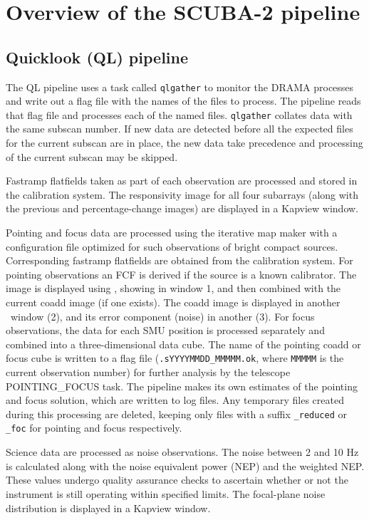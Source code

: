 \section{Overview of the SCUBA-2 pipeline\label{se:overview}}

\subsection{Quicklook (QL) pipeline}

The QL pipeline uses a task called \verb+qlgather+ to monitor the
DRAMA processes and write out a flag file with the names of the files
to process. The pipeline reads that flag file and processes each of
the named files. \verb+qlgather+ collates data with the same subscan
number. If new data are detected before all the expected files for
the current subscan are in place, the new data take precedence and
processing of the current subscan may be skipped.

Fastramp flatfields taken as part of each observation are processed
and stored in the calibration system. The responsivity image for all
four subarrays (along with the previous and percentage-change images)
are displayed in a Kapview window.

Pointing and focus data are processed using the iterative map maker
with a configuration file optimized for such observations of bright
compact sources. Corresponding fastramp flatfields are obtained from
the calibration system. For pointing observations an FCF is derived if
the source is a known calibrator. The image is displayed using \GAIA,
showing in window 1, and then combined with the current coadd image
(if one exists). The coadd image is displayed in another \GAIA\ window
(2), and its error component (noise) in another (3). For focus
observations, the data for each SMU position is processed separately
and combined into a three-dimensional data cube. The name of the
pointing coadd or focus cube is written to a flag file
(\verb+.sYYYYMMDD_MMMMM.ok+, where \verb+MMMMM+ is the current
observation number) for further analysis by the telescope
POINTING\_FOCUS task. The pipeline makes its own estimates of the
pointing and focus solution, which are written to log files. Any
temporary files created during this processing are deleted, keeping
only files with a suffix \verb+_reduced+ or \verb+_foc+ for pointing
and focus respectively.

Science data are processed as noise observations. The noise between 2
and 10 Hz is calculated along with the noise equivalent power (NEP)
and the weighted NEP. These values undergo quality assurance checks to
ascertain whether or not the instrument is still operating within
specified limits. The focal-plane noise distribution is displayed in a
Kapview window.

